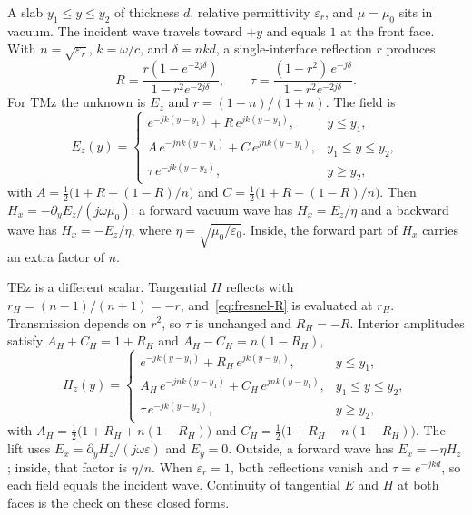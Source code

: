 \documentclass[11pt,a4paper]{article}
\numberwithin{equation}{section}
\begin{document}
A slab $y_1\le y\le y_2$ of thickness $d$, relative permittivity
$\varepsilon_r$, and $\mu=\mu_0$ sits in vacuum. The incident wave travels
toward $+y$ and equals $1$ at the front face. With $n=\sqrt{\varepsilon_r}$,
$k=\omega/c$, and $\delta=nkd$, a single-interface reflection $r$ produces
\begin{equation}
R = \frac{r(1-e^{-2j\delta})}{1-r^2 e^{-2j\delta}},
\qquad
\tau = \frac{(1-r^2)\,e^{-j\delta}}{1-r^2 e^{-2j\delta}}.
\label{eq:fresnel-R}
\end{equation}
For TMz the unknown is $E_z$ and $r=(1-n)/(1+n)$. The field is
\begin{equation}
E_z(y) =
\begin{cases}
e^{-jk(y-y_1)} + R\, e^{jk(y-y_1)}, & y\le y_1,\\[0.3em]
A\, e^{-jnk(y-y_1)} + C\, e^{jnk(y-y_1)}, & y_1\le y\le y_2,\\[0.3em]
\tau\, e^{-jk(y-y_2)}, & y\ge y_2,
\end{cases}
\label{eq:fresnel-field}
\end{equation}
with $A=\tfrac12\big(1+R+(1-R)/n\big)$ and
$C=\tfrac12\big(1+R-(1-R)/n\big)$. Then
$H_x=-\partial_y E_z/(j\omega\mu_0)$: a forward vacuum wave has
$H_x=E_z/\eta$ and a backward wave has $H_x=-E_z/\eta$, where
$\eta=\sqrt{\mu_0/\varepsilon_0}$. Inside, the forward part of $H_x$ carries
an extra factor of $n$.

TEz is a different scalar. Tangential $H$ reflects with
$r_H=(n-1)/(n+1)=-r$, and~\eqref{eq:fresnel-R} is evaluated at $r_H$.
Transmission depends on $r^2$, so $\tau$ is unchanged and $R_H=-R$.
Interior amplitudes satisfy $A_H+C_H=1+R_H$ and $A_H-C_H=n(1-R_H)$,
\begin{equation}
H_z(y) =
\begin{cases}
e^{-jk(y-y_1)} + R_H\, e^{jk(y-y_1)}, & y\le y_1,\\[0.3em]
A_H\, e^{-jnk(y-y_1)} + C_H\, e^{jnk(y-y_1)}, & y_1\le y\le y_2,\\[0.3em]
\tau\, e^{-jk(y-y_2)}, & y\ge y_2,
\end{cases}
\label{eq:fresnel-te}
\end{equation}
with $A_H=\tfrac12\big(1+R_H+n(1-R_H)\big)$ and
$C_H=\tfrac12\big(1+R_H-n(1-R_H)\big)$. The lift uses
$E_x=\partial_y H_z/(j\omega\varepsilon)$ and $E_y=0$. Outside, a forward
wave has $E_x=-\eta H_z$; inside, that factor is $\eta/n$.
When $\varepsilon_r=1$, both reflections vanish and
$\tau=e^{-jkd}$, so each field equals the incident wave. Continuity of
tangential $E$ and $H$ at both faces is the check on these closed forms.
\end{document}
